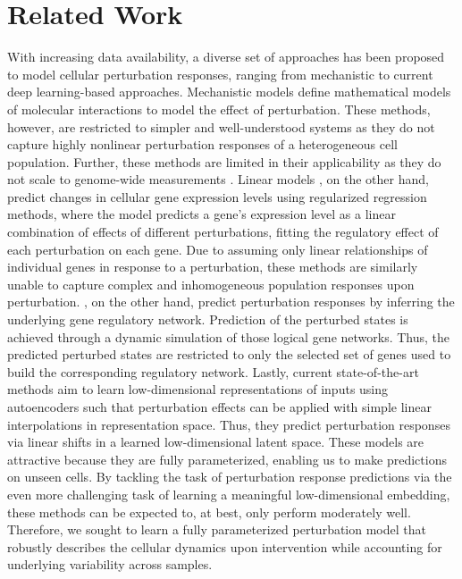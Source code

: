 \section{Related Work}

 With increasing data availability, a diverse set of approaches has been proposed to model cellular perturbation responses, ranging from mechanistic to current deep learning-based approaches.
Mechanistic models \citep{yuan2021cellbox, frohlich2018efficient} define mathematical models of molecular interactions to model the effect of perturbation.
These methods, however, are restricted to simpler and well-understood systems as they do not capture highly nonlinear perturbation responses of a heterogeneous cell population. Further, these methods are limited in their applicability as they do not scale to genome-wide measurements \citep{snijder2012single, berchtold2018systems, green2016systems}.
Linear models \citep{dixit2016perturb, kamimoto2020celloracle}, on the other hand,  predict changes in cellular gene expression levels using regularized regression methods, where the model predicts a gene's expression level as a linear combination of effects of different perturbations, fitting the regulatory effect of each perturbation on each gene.
Due to assuming only linear relationships of individual genes in response to a perturbation, these methods are similarly  unable to capture complex and inhomogeneous population responses upon perturbation.
\citet{heydari2022iqcell}, on the other hand, predict perturbation responses by inferring the underlying gene regulatory network. Prediction of the perturbed states is achieved through a dynamic simulation of those logical gene networks. Thus, the predicted perturbed states are restricted to only the selected set of genes used to build the corresponding regulatory network.
Lastly, current state-of-the-art methods \citep{lopez2018scvi, lotfollahi2019scgen, yang2020predicting} aim to learn low-dimensional representations of inputs using autoencoders such that perturbation effects can be applied with simple linear interpolations in representation space. Thus, they predict perturbation responses via linear shifts in a learned low-dimensional latent space. These models are attractive because they are fully parameterized, enabling us to make predictions on unseen cells. By tackling the task of perturbation response predictions via the even more challenging task of learning a meaningful low-dimensional embedding, these methods can be expected to, at best, only perform moderately well. Therefore, we sought to learn a fully parameterized perturbation model that robustly describes the cellular dynamics upon intervention while accounting for underlying variability across samples.


